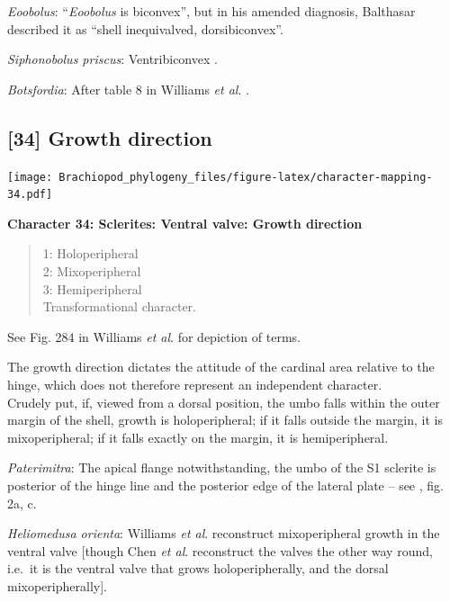 \documentclass[]{book}
\theoremstyle{definition}
\theoremstyle{definition}
\theoremstyle{definition}
\theoremstyle{remark}
\begin{document}
\emph{Eoobolus}: ``\emph{Eoobolus} is biconvex'', but in his amended
diagnosis, Balthasar \citeyearpar{Balthasar2009Thebrachiopod} described
it as ``shell inequivalved, dorsibiconvex''.

\emph{Siphonobolus priscus}: Ventribiconvex
\citep{Popov2009Earlyontogeny}.

\emph{Botsfordia}: After table 8 in Williams \emph{et al}.
\citeyearpar{Williams2000BrachiopodaLinguliformea}.

\hypertarget{growth-direction-1}{%
\subsection*{{[}34{]} Growth direction}\label{growth-direction-1}}

\texttt{[image: Brachiopod\_phylogeny\_files/figure-latex/character-mapping-34.pdf]}

\textbf{Character 34: Sclerites: Ventral valve: Growth direction}

\begin{quote}
1: Holoperipheral\\
2: Mixoperipheral\\
3: Hemiperipheral\\
Transformational character.
\end{quote}

See Fig. 284 in Williams \emph{et al}.
\citeyearpar{Williams1997BrachiopodaRevised} for depiction of terms.

The growth direction dictates the attitude of the cardinal area relative
to the hinge, which does not therefore represent an independent
character.\\
Crudely put, if, viewed from a dorsal position, the umbo falls within
the outer margin of the shell, growth is holoperipheral; if it falls
outside the margin, it is mixoperipheral; if it falls exactly on the
margin, it is hemiperipheral.

\emph{Paterimitra}: The apical flange notwithstanding, the umbo of the
S1 sclerite is posterior of the hinge line and the posterior edge of the
lateral plate -- see \citet{Larsson2014iPaterimitra}, fig. 2a, c.

\emph{Heliomedusa orienta}: Williams \emph{et al}.
\citeyearpar[2007]{Williams2000BrachiopodaLinguliformea} reconstruct
mixoperipheral growth in the ventral valve {[}though Chen \emph{et al}.
\citeyearpar{Chen2007Reinterpretationof} reconstruct the valves the
other way round, i.e.~it is the ventral valve that grows
holoperipherally, and the dorsal mixoperipherally{]}.
\end{document}
